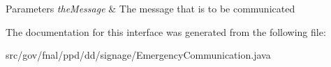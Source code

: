 \begin{DoxyParams}{Parameters}
{\em the\-Message} & The message that is to be communicated \\
\hline
\end{DoxyParams}


The documentation for this interface was generated from the following file\-:\begin{DoxyCompactItemize}
\item 
src/gov/fnal/ppd/dd/signage/Emergency\-Communication.\-java\end{DoxyCompactItemize}
